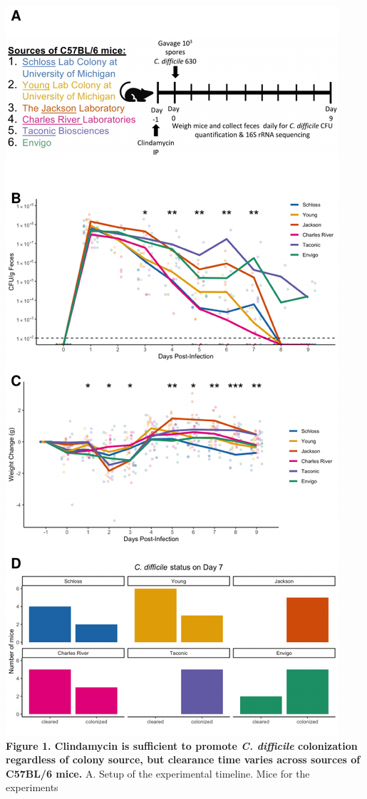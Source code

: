 \documentclass[11pt,]{article}
\begin{document}
\includegraphics{figure_1.pdf} \textbf{Figure 1. Clindamycin is
sufficient to promote \emph{C. difficile} colonization regardless of
colony source, but clearance time varies across sources of C57BL/6
mice.} A. Setup of the experimental timeline. Mice for the experiments
\end{document}
